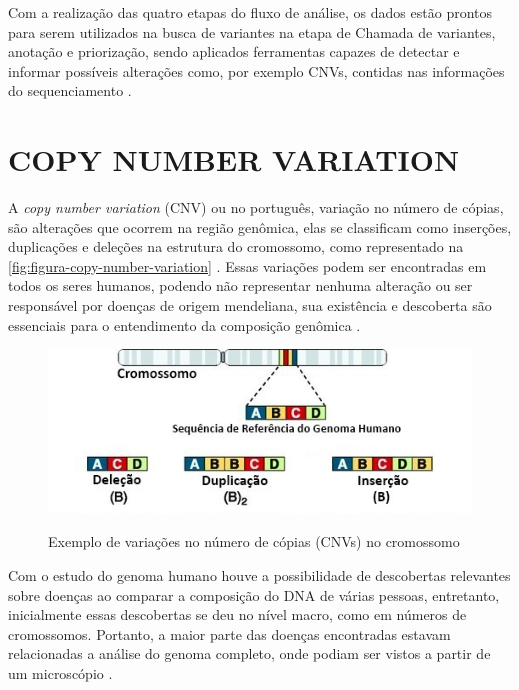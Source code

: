 Com a realização das quatro etapas do fluxo de análise, os dados estão prontos para serem utilizados na busca de variantes na etapa de Chamada de variantes, anotação e priorização, sendo aplicados ferramentas capazes de detectar e informar possíveis alterações como, por exemplo CNVs, contidas nas informações do sequenciamento \cite{Bao2014}.

\section{COPY NUMBER VARIATION} 
\label{sec:copyNumberVariation}

A \textit{copy number variation} (CNV) ou no português, variação no número de cópias, são alterações que ocorrem na região genômica, elas se classificam como inserções, duplicações e deleções na estrutura do cromossomo, como representado na \autoref{fig:figura-copy-number-variation} \cite{Zhao2013,Redon2006}. Essas variações podem ser encontradas em todos os seres humanos, podendo não representar nenhuma alteração ou ser responsável por doenças de origem mendeliana, sua existência e descoberta são essenciais para o entendimento da composição genômica \cite{Redon2006,Feuk2006}.

\begin{figure}[!htb]
    \centering
    \caption{Exemplo de variações no número de cópias (CNVs) no cromossomo}
    \includegraphics[width=1\textwidth]{./dados/figuras/copy-number-variation}
    \label{fig:figura-copy-number-variation}
\end{figure}

Com o estudo do genoma humano \cite{Lander2001} houve a possibilidade de descobertas relevantes sobre doenças ao comparar a composição do DNA de várias pessoas, entretanto, inicialmente essas descobertas se deu no nível macro, como em números de cromossomos. Portanto, a maior parte das doenças encontradas estavam relacionadas a análise do genoma completo, onde podiam ser vistos a partir de um microscópio \cite{Feuk2006}.

